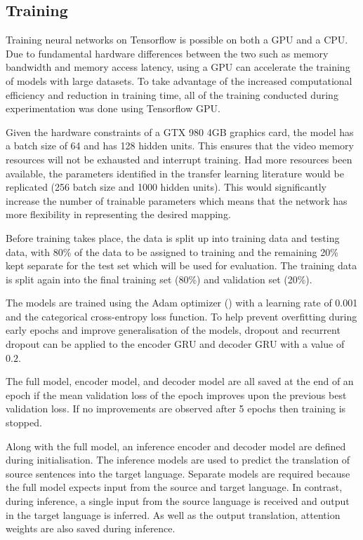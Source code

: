 \subsection{Training}
Training neural networks on Tensorflow is possible on both a GPU and a CPU. Due to fundamental hardware differences between the two such as memory bandwidth and memory access latency, using a GPU can accelerate the training of models with large datasets. To take advantage of the increased computational efficiency and reduction in training time, all of the training conducted during experimentation was done using Tensorflow GPU.

Given the hardware constraints of a GTX 980 4GB graphics card, the model has a batch size of 64 and has 128 hidden units. This ensures that the video memory resources will not be exhausted and interrupt training. Had more resources been available, the parameters identified in the transfer learning literature would be replicated (256 batch size and 1000 hidden units). This would significantly increase the number of trainable parameters which means that the network has more flexibility in representing the desired mapping.

Before training takes place, the data is split up into training data and testing data, with 80\% of the data to be assigned to training and the remaining 20\% kept separate for the test set which will be used for evaluation. The training data is split again into the final training set (80\%) and validation set (20\%).

The models are trained using the Adam optimizer (\cite{adam_optimizer_2014}) with a learning rate of 0.001 and the categorical cross-entropy loss function. To help prevent overfitting during early epochs and improve generalisation of the models, dropout and recurrent dropout can be applied to the encoder \acrshort{GRU} and decoder \acrshort{GRU} with a value of $0.2$. 

The full model, encoder model, and decoder model are all saved at the end of an epoch if the mean validation loss of the epoch improves upon the previous best validation loss. If no improvements are observed after 5 epochs then training is stopped.


Along with the full model, an inference encoder and decoder model are defined during initialisation. The inference models are used to predict the translation of source sentences into the target language. Separate models are required because the full model expects input from the source and target language. In contrast, during inference, a single input from the source language is received and output in the target language is inferred. As well as the output translation, attention weights are also saved during inference.

